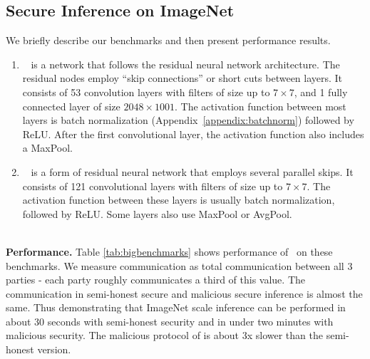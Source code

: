 \subsection{Secure Inference on ImageNet}\label{subsec:bigbenchmarks}
We briefly describe our  benchmarks and then present performance results.
\begin{enumerate}
\item \resnet~\cite{resnet} is a network that follows the residual neural network architecture. 
The residual nodes employ ``skip connections'' or short cuts between layers.
 It consists of 53 convolution layers with filters of size up to $7\times 7$, and 1 fully connected layer of size $2048\times 1001$. The activation function between most layers is batch normalization (Appendix~\ref{appendix:batchnorm}) followed by ReLU. After the first convolutional layer, the activation function also includes a MaxPool.

\item \densenet~\cite{densenet} is a form of residual neural network that employs several parallel skips. It consists of 121 convolutional layers with filters of size up to $7\times 7$. The activation function between these layers is usually batch normalization, followed by ReLU. Some layers also use MaxPool or AvgPool. 

\end{enumerate}~\\
\noindent\textbf{Performance.} Table \ref{tab:bigbenchmarks} shows performance of \cryptflow\ on these benchmarks.
 We measure communication as total communication between all $3$ parties - each party roughly communicates a third of this value. The communication in semi-honest secure and malicious secure inference is almost the same. Thus demonstrating that ImageNet scale inference can be performed in about 30 seconds with semi-honest security and in under two minutes with malicious security. The malicious protocol of \tool is about 3x slower than the semi-honest version.



